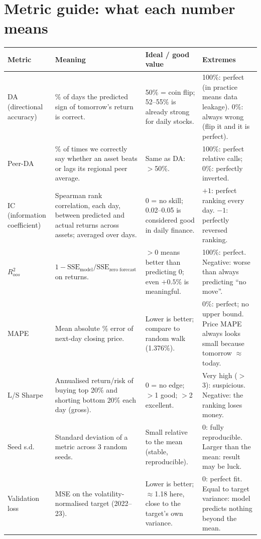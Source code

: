 \documentclass[10pt,a4paper]{article}
\begin{document}
\section{Metric guide: what each number means}
\begin{center}\footnotesize
\begin{tabularx}{\linewidth}{@{}p{2.1cm}Xp{3.0cm}X@{}}
\toprule
\textbf{Metric} & \textbf{Meaning} & \textbf{Ideal / good value} & \textbf{Extremes}\\\midrule
DA (directional accuracy) & \% of days the predicted sign of tomorrow's return is correct. & 50\% = coin flip; 52--55\% is already strong for daily stocks. & 100\%: perfect (in practice means data leakage). 0\%: always wrong (flip it and it is perfect).\\
Peer-DA & \% of times we correctly say whether an asset beats or lags its regional peer average. & Same as DA: $>$50\%. & 100\%: perfect relative calls; 0\%: perfectly inverted.\\
IC (information coefficient) & Spearman rank correlation, each day, between predicted and actual returns across assets; averaged over days. & 0 = no skill; 0.02--0.05 is considered good in daily finance. & $+1$: perfect ranking every day. $-1$: perfectly reversed ranking.\\
$R^2_{oos}$ & $1-\mathrm{SSE}_{\text{model}}/\mathrm{SSE}_{\text{zero forecast}}$ on returns. & $>0$ means better than predicting 0; even $+0.5$\% is meaningful. & 100\%: perfect. Negative: worse than always predicting ``no move''.\\
MAPE & Mean absolute \% error of next-day closing price. & Lower is better; compare to random walk (1.376\%). & 0\%: perfect; no upper bound. Price MAPE always looks small because tomorrow $\approx$ today.\\
L/S Sharpe & Annualised return/risk of buying top 20\% and shorting bottom 20\% each day (gross). & 0 = no edge; $>$1 good; $>$2 excellent. & Very high ($>$3): suspicious. Negative: the ranking loses money.\\
Seed s.d. & Standard deviation of a metric across 3 random seeds. & Small relative to the mean (stable, reproducible). & 0: fully reproducible. Larger than the mean: result may be luck.\\
Validation loss & MSE on the volatility-normalised target (2022--23). & Lower is better; $\approx$1.18 here, close to the target's own variance. & 0: perfect fit. Equal to target variance: model predicts nothing beyond the mean.\\\bottomrule
\end{tabularx}
\end{center}
\end{document}
